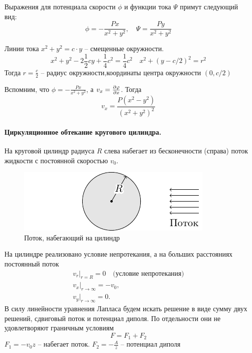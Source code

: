 Выражения для потенциала скорости $\phi$ и функции тока $\Psi$ примут следующий вид:
\begin{equation}
	\phi=-\frac{Px}{x^2+y^2}, \quad
	\Psi=\frac{Py}{x^2+y^2}
\end{equation}

Линии тока $x^2+y^2=c\cdot y$ -- смещенные окружности.
\begin{equation}
	x^2+y^2-2\frac{1}{2}cy+\frac{1}{4}c^2=\frac{1}{4}c^2 \quad
	x^2+(y-c/2)^2=r^2
\end{equation}
Тогда $r=\frac{c}{2}$ -- радиус окружности,координаты центра окружности $(0,c/2)$

Вспомним, что $\phi=-\frac{Px}{x^2+y^2}$, а $v_x=\pdv{\varphi}{x}$. Тогда 
$$
v_x=\frac{P(x^2-y^2)}{(x^2+y^2)^2}
$$

\paragraph{Циркуляционное обтекание кругового цилиндра.} 
На круговой цилиндр радиуса $R$ слева набегает из бесконечности
(справа) поток жидкости с постоянной скоростью $v_0$.
\begin{figure}[h!]
    \centering
    \includegraphics[scale=1.5]{img/cyl1}
    \caption{Поток, набегающий на цилиндр}
    \label{fig:figure1}
\end{figure}

На цилиндре реализовано условие непротекания, а на больших
расстояниях постоянный поток
\begin{gather}
	v_r|_{r=R}=0 \quad \text{(условие непротекания)} \\ 
	v_x|_{r\to\infty}=-v_0, \\
	v_y|_{r\to\infty}=0.
\end{gather}
В силу линейности уравнения Лапласа будем искать решение в виде
сумму двух решений, сдвиговый поток и потенциал диполя. По
отдельности они не удовлетворяют граничным условиям
\begin{equation}
	F=F_1+F_2
\end{equation}
$F_1=-v_0z$ -- набегает поток. 
$\displaystyle F_2=-\frac{A}{z}$ -- потенциал диполя

